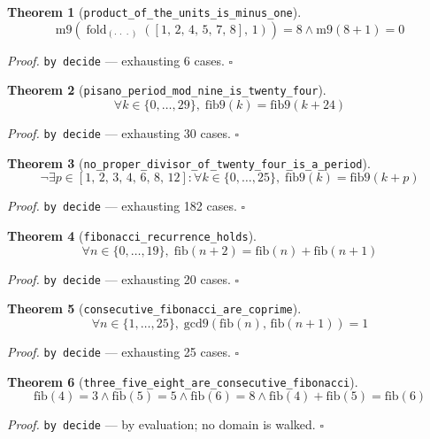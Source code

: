 \documentclass[11pt]{article}
\newtheorem{theorem}{Theorem}[section]
\begin{document}
\begin{theorem}[\texttt{product\_of\_the\_units\_is\_minus\_one}]
\[ \mathrm{m9}\mathopen{}\left(\operatorname{fold}_{(\cdot\,\cdot\,\cdot)}\left([1,\,2,\,4,\,5,\,7,\,8],\, 1\right)\right) = 8 \land \mathrm{m9}\mathopen{}\left(8 + 1\right) = 0 \]
\end{theorem}
\noindent\emph{Proof.} \texttt{by decide} --- exhausting 6 cases. \hfill$\square$

\begin{theorem}[\texttt{pisano\_period\_mod\_nine\_is\_twenty\_four}]
\[ \forall k \in \{0,\dots,29\},\; \mathrm{fib9}\mathopen{}\left(k\right) = \mathrm{fib9}\mathopen{}\left(k + 24\right) \]
\end{theorem}
\noindent\emph{Proof.} \texttt{by decide} --- exhausting 30 cases. \hfill$\square$

\begin{theorem}[\texttt{no\_proper\_divisor\_of\_twenty\_four\_is\_a\_period}]
\[ \lnot \exists p \in [1,\,2,\,3,\,4,\,6,\,8,\,12] : \forall k \in \{0,\dots,25\},\; \mathrm{fib9}\mathopen{}\left(k\right) = \mathrm{fib9}\mathopen{}\left(k + p\right) \]
\end{theorem}
\noindent\emph{Proof.} \texttt{by decide} --- exhausting 182 cases. \hfill$\square$

\begin{theorem}[\texttt{fibonacci\_recurrence\_holds}]
\[ \forall n \in \{0,\dots,19\},\; \mathrm{fib}\mathopen{}\left(n + 2\right) = \mathrm{fib}\mathopen{}\left(n\right) + \mathrm{fib}\mathopen{}\left(n + 1\right) \]
\end{theorem}
\noindent\emph{Proof.} \texttt{by decide} --- exhausting 20 cases. \hfill$\square$

\begin{theorem}[\texttt{consecutive\_fibonacci\_are\_coprime}]
\[ \forall n \in \{1,\dots,25\},\; \mathrm{gcd9}\mathopen{}\left(\mathrm{fib}\mathopen{}\left(n\right),\,\mathrm{fib}\mathopen{}\left(n + 1\right)\right) = 1 \]
\end{theorem}
\noindent\emph{Proof.} \texttt{by decide} --- exhausting 25 cases. \hfill$\square$

\begin{theorem}[\texttt{three\_five\_eight\_are\_consecutive\_fibonacci}]
\[ \mathrm{fib}\mathopen{}\left(4\right) = 3 \land \mathrm{fib}\mathopen{}\left(5\right) = 5 \land \mathrm{fib}\mathopen{}\left(6\right) = 8 \land \mathrm{fib}\mathopen{}\left(4\right) + \mathrm{fib}\mathopen{}\left(5\right) = \mathrm{fib}\mathopen{}\left(6\right) \]
\end{theorem}
\noindent\emph{Proof.} \texttt{by decide} --- by evaluation; no domain is walked. \hfill$\square$
\end{document}
